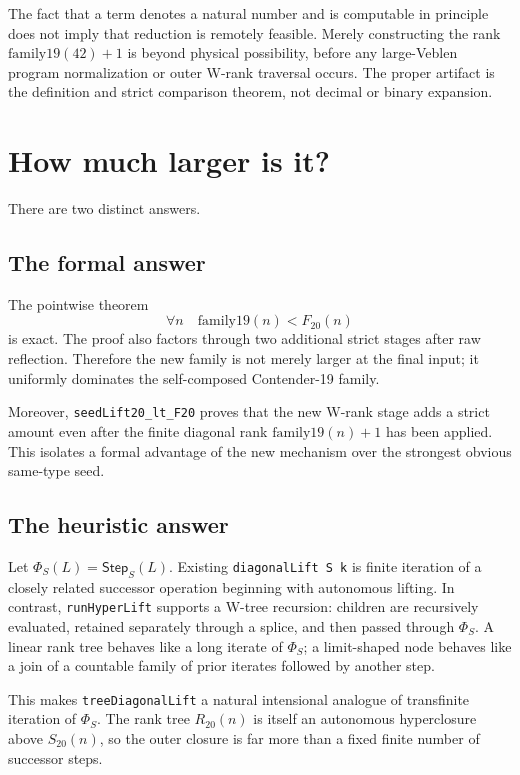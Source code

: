 \documentclass[11pt]{article}
\theoremstyle{definition}
\theoremstyle{remark}
\newcommand{\code}[1]{\texttt{#1}}
\newcommand{\Step}{\mathsf{Step}}
\begin{document}
The fact that a term denotes a natural number and is computable in principle
does not imply that reduction is remotely feasible.  Merely constructing the
rank \(\mathrm{family19}(42)+1\) is beyond physical possibility, before any
large-Veblen program normalization or outer W-rank traversal occurs.  The
proper artifact is the definition and strict comparison theorem, not decimal
or binary expansion.

\section{How much larger is it?}

There are two distinct answers.

\subsection{The formal answer}

The pointwise theorem
\[
\forall n\quad \mathrm{family19}(n)<F_{20}(n)
\]
is exact.  The proof also factors through two additional strict stages after
raw reflection.  Therefore the new family is not merely larger at the final
input; it uniformly dominates the self-composed Contender-19 family.

Moreover, \code{seedLift20\_lt\_F20} proves that the new W-rank stage adds a
strict amount even after the finite diagonal rank
\(\mathrm{family19}(n)+1\) has been applied.  This isolates a formal advantage
of the new mechanism over the strongest obvious same-type seed.

\subsection{The heuristic answer}

Let \(\Phi_S(L)=\Step_S(L)\).  Existing \code{diagonalLift S k} is finite
iteration of a closely related successor operation beginning with autonomous
lifting.  In contrast, \code{runHyperLift} supports a W-tree recursion:
children are recursively evaluated, retained separately through a splice, and
then passed through \(\Phi_S\).  A linear rank tree behaves like a long iterate
of \(\Phi_S\); a limit-shaped node behaves like a join of a countable family of
prior iterates followed by another step.

This makes \code{treeDiagonalLift} a natural intensional analogue of
transfinite iteration of \(\Phi_S\).  The rank tree \(R_{20}(n)\) is itself an
autonomous hyperclosure above \(S_{20}(n)\), so the outer closure is far more
than a fixed finite number of successor steps.
\end{document}
